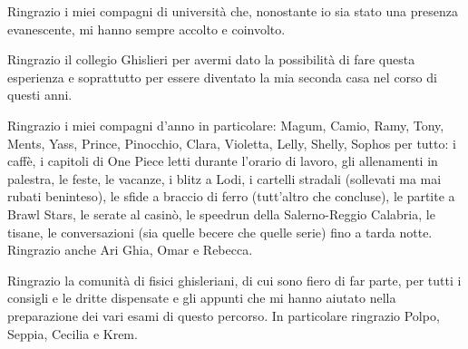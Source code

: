 \documentclass[12pt,a4paper,oneside,openany]{book}
\begin{document}
\noindent Ringrazio i miei compagni di università che, nonostante io sia stato una presenza evanescente, mi hanno sempre accolto e coinvolto.

\noindent Ringrazio il collegio Ghislieri per avermi dato la possibilità di fare questa esperienza e soprattutto per essere diventato la mia seconda casa nel corso di questi anni.

\noindent Ringrazio i miei compagni d’anno in particolare: Magum, Camio, Ramy, Tony, Ments, Yass, Prince, Pinocchio, Clara, Violetta, Lelly, Shelly, Sophos per tutto: i caffè, i capitoli di One Piece letti durante l'orario di lavoro, gli allenamenti in palestra, le feste, le vacanze, i blitz a Lodi, i cartelli stradali (sollevati ma mai rubati beninteso), le sfide a braccio di ferro (tutt'altro che concluse), le partite a Brawl Stars, le serate al casinò, le speedrun della Salerno-Reggio Calabria, le tisane, le conversazioni (sia quelle becere che quelle serie) fino a tarda notte. Ringrazio anche Ari Ghia, Omar e Rebecca.

\noindent Ringrazio la comunità di fisici ghisleriani, di cui sono fiero di far parte, per tutti i consigli e le dritte dispensate e gli appunti che mi hanno aiutato nella preparazione dei vari esami di questo percorso. In particolare ringrazio Polpo, Seppia, Cecilia e Krem.
\end{document}
